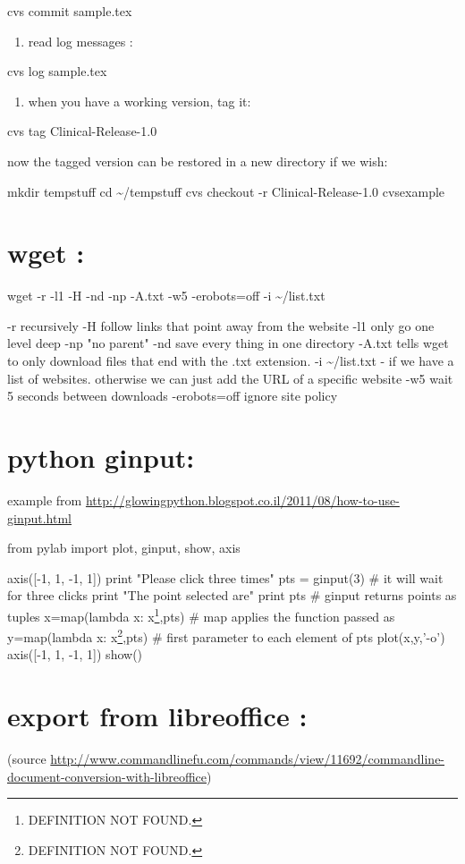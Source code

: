 \documentclass[11pt]{article}
\begin{document}
cvs commit sample.tex

\begin{enumerate}
\item read log messages :
\end{enumerate}
cvs log sample.tex

\begin{enumerate}
\item when you have a working version, tag it:
\end{enumerate}

cvs tag Clinical-Release-1.0

now the tagged version can be restored in a new directory if we wish:

mkdir tempstuff
cd \textasciitilde{}/tempstuff
cvs checkout -r Clinical-Release-1.0 cvsexample

\section{wget :}
\label{sec-7}

wget -r -l1 -H -nd -np -A.txt -w5 -erobots=off -i \textasciitilde{}/list.txt

-r recursively
-H follow links that point away from the website
-l1 only go one level deep
-np "no parent"
-nd save every thing in one directory
-A.txt tells wget to only download files that end with the .txt extension. 
-i \textasciitilde{}/list.txt - if we have a list of websites. otherwise we can just add the URL of a specific website
-w5 wait 5 seconds between downloads
-erobots=off ignore site policy
\section{python ginput:}
\label{sec-8}

example from \url{http://glowingpython.blogspot.co.il/2011/08/how-to-use-ginput.html}

from pylab import plot, ginput, show, axis

axis([-1, 1, -1, 1])
print "Please click three times"
pts = ginput(3) \# it will wait for three clicks
print "The point selected are"
print pts \# ginput returns points as tuples
x=map(lambda x: x\footnote{DEFINITION NOT FOUND.},pts) \# map applies the function passed as 
y=map(lambda x: x\footnote{DEFINITION NOT FOUND.},pts) \# first parameter to each element of pts
plot(x,y,'-o')
axis([-1, 1, -1, 1])
show()
\section{export from libreoffice :}
\label{sec-9}
(source \url{http://www.commandlinefu.com/commands/view/11692/commandline-document-conversion-with-libreoffice})
\end{document}
